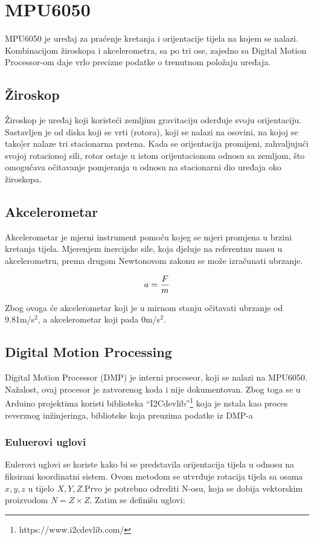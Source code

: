 \documentclass[../Document.tex]{subfiles}
\begin{document}
\section{MPU6050}

MPU6050 je uređaj za praćenje kretanja i orijentacije tijela na kojem se nalazi. Kombinacijom žiroskopa i akcelerometra, sa po tri ose, zajedno sa Digital Motion Processor-om daje vrlo precizne podatke o trenutnom položaju uređaja.

\subsection{Žiroskop}
Žiroskop je uređaj koji koristeći zemljinu gravitaciju oderđuje svoju orijentaciju. Sastavljen je od diska koji se vrti (rotora), koji se nalazi na osovini, na kojoj se tako]er nalaze tri stacionarna prstena. Kada se orijentacija promijeni, zahvaljujući svojoj rotacionoj sili, rotor ostaje u istom orijentacionom odnosu sa zemljom, što omogućava očitavanje pomjeranja u odnosu na stacionarni dio uređaja oko žiroskopa.


\subsection{Akcelerometar}
Akcelerometar je mjerni instrument pomoću kojeg se mjeri promjena u brzini kretanja tijela. Mjerenjem inercijske sile, koja djeluje na referentnu masu u akcelerometru, prema drugom Newtonovom zakonu se može izračunati ubrzanje.

$$
    \centering
    a = \frac{F}{m}
$$

\noindent Zbog ovoga će akcelerometar koji je u mirnom stanju očitavati ubrzanje od 9.81m/s$^2$, a akcelerometar koji pada 0m/s$^2$.

\subsection{Digital Motion Processing}

Digital Motion Processor (DMP) je interni proceseor, koji se nalazi na MPU6050. Nažalost, ovaj procesor je zatvorenog koda i nije dokumentovan. Zbog toga se u Arduino projektima koristi biblioteka ``I2Cdevlib''\footnote{https://www.i2cdevlib.com/} koja je nstala kao proces reverznog inžinjeringa, biblioteke koja preuzima podatke iz DMP-a

\subsubsection{Euluerovi uglovi}
Eulerovi uglovi se koriste kako bi se predstavila orijentacija tijela u odnosu na fiksirani koordinatni sistem. Ovom metodom se utvrđuje rotacija tijela sa osama $x,y,z$ u tijelo $X,Y,Z$.Prvo je potrebno odrediti N-osu, koja se dobija vektorskim proizvodom $N=Z \times Z$. Zatim se definišu uglovi:
\end{document}
